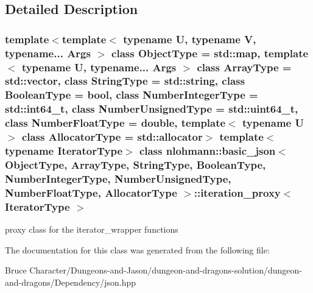 \subsection{Detailed Description}
\subsubsection*{template$<$template$<$ typename U, typename V, typename... Args $>$ class Object\+Type = std\+::map, template$<$ typename U, typename... Args $>$ class Array\+Type = std\+::vector, class String\+Type = std\+::string, class Boolean\+Type = bool, class Number\+Integer\+Type = std\+::int64\+\_\+t, class Number\+Unsigned\+Type = std\+::uint64\+\_\+t, class Number\+Float\+Type = double, template$<$ typename U $>$ class Allocator\+Type = std\+::allocator$>$\newline
template$<$typename Iterator\+Type$>$\newline
class nlohmann\+::basic\+\_\+json$<$ Object\+Type, Array\+Type, String\+Type, Boolean\+Type, Number\+Integer\+Type, Number\+Unsigned\+Type, Number\+Float\+Type, Allocator\+Type $>$\+::iteration\+\_\+proxy$<$ Iterator\+Type $>$}

proxy class for the iterator\+\_\+wrapper functions 

The documentation for this class was generated from the following file\+:\begin{DoxyCompactItemize}
\item 
Bruce Character/\+Dungeons-\/and-\/\+Jason/dungeon-\/and-\/dragons-\/solution/dungeon-\/and-\/dragons/\+Dependency/json.\+hpp\end{DoxyCompactItemize}
